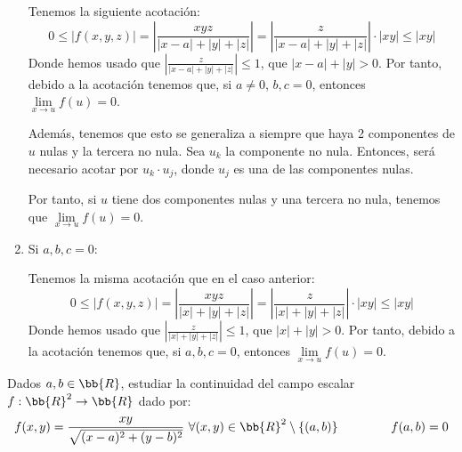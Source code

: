 \begin{ejercicio}
\begin{enumerate}
        Tenemos la siguiente acotación:
        \begin{equation*}
            0\leq |f(x,y,z)| =\left|\frac{xyz}{|x-a|+|y|+|z|}\right| = \left|\frac{z}{|x-a|+|y|+|z|}\right|\cdot |xy| \leq |xy|
        \end{equation*}
        Donde hemos usado que $\left|\frac{z}{|x-a|+|y|+|z|}\right|\leq 1$, que $|x-a|+|y|>0$. Por tanto, debido a la acotación tenemos que, si $a\neq 0$, $b,c=0$, entonces $\lim\limits_{x\to u}f(u)=0$.
        
        Además, tenemos que esto se generaliza a siempre que haya 2 componentes de $u$ nulas y la tercera no nula. Sea $u_k$ la componente no nula. Entonces, será necesario acotar por $u_k\cdot u_j$, donde $u_j$ es una de las componentes nulas.

        Por tanto, si $u$ tiene dos componentes nulas y una tercera no nula, tenemos que $\lim\limits_{x\to u}f(u)=0$.

        \item Si $a,b,c=0$:

        Tenemos la misma acotación que en el caso anterior:
        \begin{equation*}
            0\leq |f(x,y,z)| =\left|\frac{xyz}{|x|+|y|+|z|}\right| = \left|\frac{z}{|x|+|y|+|z|}\right|\cdot |xy| \leq |xy|
        \end{equation*}
        Donde hemos usado que $\left|\frac{z}{|x|+|y|+|z|}\right|\leq 1$, que $|x|+|y|>0$. Por tanto, debido a la acotación tenemos que, si $a,b,c=0$, entonces $\lim\limits_{x\to u}f(u)=0$.
    \end{enumerate}
\end{ejercicio}


\begin{ejercicio} Dados $a,b\in \bb{R}$, estudiar la continuidad del campo escalar $f:\bb{R}^2\to \bb{R}$ dado por:
\begin{equation*}
    f(x,y)=\frac{xy}{\sqrt{(x-a)^2 + (y-b)^2}}~\forall (x,y)\in \bb{R}^2\setminus \{(a,b)\} \hspace{1.5cm} f(a,b)=0
\end{equation*}
    
\end{ejercicio}